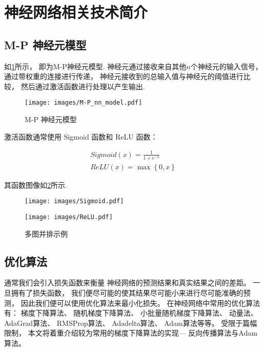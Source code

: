 \section{神经网络相关技术简介}

\subsection{M-P 神经元模型}

如\cref{fig:M-P}所示，
即为M-P神经元模型.
神经元通过接收来自其他$n$个神经元的输入信号，
通过带权重的连接进行传递，
神经元接收到的总输入值与神经元的阈值进行比较，
然后通过激活函数进行处理以产生输出\cite{zhouzhihuaJiQiXueXi}.

\begin{figure}[!htbp]
    \centering
    \texttt{[image: images/M-P\_nn\_model.pdf]}
    \caption{M-P 神经元模型}\label{fig:M-P}
\end{figure}

激活函数通常使用 Sigmoid 函数和 ReLU 函数：

\begin{equation}
    \label{eq:sigmoid}
    \begin{aligned}
        Sigmoid\left(x\right) = \frac{1}{1+e^{-x}} \\
        ReLU\left(x\right) = \max\left\{0, x\right\}
    \end{aligned}
\end{equation}

其函数图像如\cref{fig:active-func}所示.

\begin{figure}
    \centering
    \begin{minipage}[b]{0.45\textwidth}
        \centering
        \texttt{[image: images/Sigmoid.pdf]}
        \label{fig:sigmoid}
    \end{minipage}
    \begin{minipage}[b]{0.45\textwidth}
        \centering
        \texttt{[image: images/ReLU.pdf]}
        \label{fig:ReLu}
    \end{minipage}
    \caption{多图并排示例}\label{fig:active-func}
\end{figure}

\subsection{优化算法}

通常我们会引入损失函数来衡量
神经网络的预测结果和真实结果之间的差距。
一旦拥有了损失函数，
我们便尽可能的使其结果尽可能小来进行尽可能准确的预测，
因此我们便可以使用优化算法来最小化损失。
在神经网络中常用的优化算法有：
梯度下降算法、
随机梯度下降算法、
小批量随机梯度下降算法、
动量法、
AdaGrad算法、
RMSProp算法、
Adadelta算法、
Adam算法等等。
受限于篇幅限制，
本文将着重介绍较为常用的梯度下降算法的实现---
反向传播算法与Adam算法。

